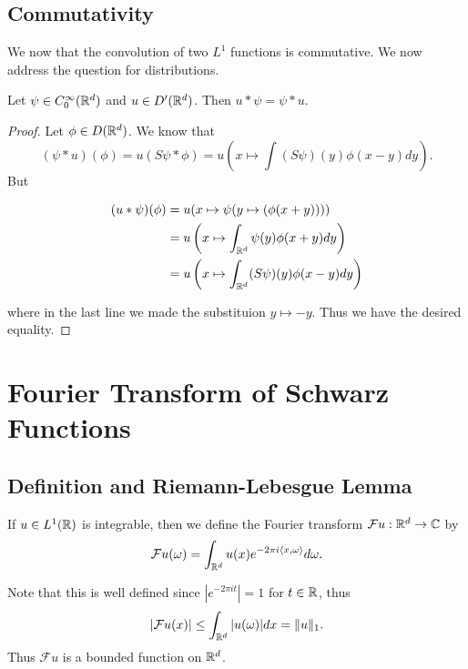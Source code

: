 \documentclass[twoside, a4paper, 10pt]{amsart}
\begin{document}
\subsection{Commutativity}

We now that the convolution of two $L^1$ functions is commutative. We now address the question for distributions.

\begin{lemma} Let $\psi \in C_0^{\infty}(\mathbb{R}^d)$ and $u \in D'(\mathbb{R}^d)$. Then $u * \psi = \psi * u$.

\end{lemma}

\begin{proof} Let $\phi \in D(\mathbb{R}^d)$. We know that $$(\psi * u)(\phi) = u(S\psi * \phi) = u\left(x \mapsto \int (S\psi)(y) \phi(x-y) dy \right).$$ But 

\begin{align*} (u*\psi)(\phi) &= u(x \mapsto \psi(y \mapsto (\phi(x+y)))) \\ &= u\left( x \mapsto \int_{\mathbb{R}^d} \psi(y)\phi(x+y) dy \right) \\ &= u\left( x \mapsto \int_{\mathbb{R}^d} (S\psi)(y)\phi(x-y) dy \right)  \end{align*} 

where in the last line we made the substituion $y \mapsto -y$. Thus we have the desired equality. \end{proof}

\section{Fourier Transform of Schwarz Functions}

\subsection{Definition and Riemann-Lebesgue Lemma}

\begin{mydef}\label{def: fourier of integrable} If $u \in L^1(\mathbb{R})$ is integrable, then we define the Fourier transform $\mathcal{F}u:\mathbb{R}^d \to \mathbb{C}$ by $$\mathcal{F}u(\omega) = \int_{\mathbb{R}^d} u(x) e^{-2\pi i \langle x, \omega \rangle } d\omega.$$

\end{mydef}

Note that this is well defined since $|e^{-2\pi it}| = 1$ for $t \in \mathbb{R}$, thus $$|\mathcal{F}u(x)| \leq \int_{\mathbb{R}^d} |u(\omega)| dx = \| u \|_1. $$ Thus $\mathcal{F}u$ is a bounded function on $\mathbb{R}^d$.
\end{document}
